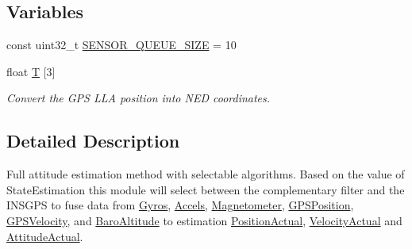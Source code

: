 \subsection*{\-Variables}
\begin{DoxyCompactItemize}
\item 
const uint32\-\_\-t \hyperlink{group___attitude_module_ga5c62d2531c3e579a49d025858bd52a83}{\-S\-E\-N\-S\-O\-R\-\_\-\-Q\-U\-E\-U\-E\-\_\-\-S\-I\-Z\-E} = 10
\item 
float \hyperlink{group___attitude_module_ga62b409271acba166dbf31b4fed9af697}{\-T} \mbox{[}3\mbox{]}
\begin{DoxyCompactList}\small\item\em \-Convert the \-G\-P\-S \-L\-L\-A position into \-N\-E\-D coordinates. \end{DoxyCompactList}\end{DoxyCompactItemize}


\subsection{\-Detailed \-Description}
\-Full attitude estimation method with selectable algorithms. \-Based on the value of \-State\-Estimation this module will select between the complementary filter and the \-I\-N\-S\-G\-P\-S to fuse data from \hyperlink{group___gyros}{\-Gyros}, \hyperlink{group___accels}{\-Accels}, \hyperlink{group___magnetometer}{\-Magnetometer}, \hyperlink{group___g_p_s_position}{\-G\-P\-S\-Position}, \hyperlink{group___g_p_s_velocity}{\-G\-P\-S\-Velocity}, and \hyperlink{group___baro_altitude}{\-Baro\-Altitude} to estimation \hyperlink{group___position_actual}{\-Position\-Actual}, \hyperlink{group___velocity_actual}{\-Velocity\-Actual} and \hyperlink{group___attitude_actual}{\-Attitude\-Actual}. 

